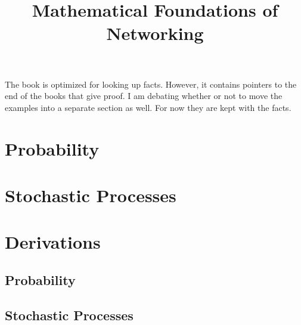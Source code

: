 \documentclass[letterpaper,12pt]{article}
\title{Mathematical Foundations of Networking}
\begin{document}
\raggedright

\setlength{\columnseprule}{0.5pt}
\setcounter{tocdepth}{4}
\tableofcontents

The book is optimized for looking up facts. However, it contains pointers to the
end of the books that give proof. I am debating whether or not to move the
examples into a separate section as well. For now they are kept with the facts. 

\section{Probability}

\section{Stochastic Processes}


\section{Derivations}
\subsection{Probability}

\subsection{Stochastic Processes}

\end{document}
